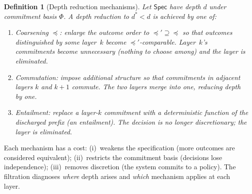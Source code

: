 \documentclass[acmsmall,review,anonymous]{acmart}
\newcommand{\Spec}{\mathsf{Spec}}
\newcommand{\Ord}{\preceq}
\newtheorem{definition}{Definition}
\theoremstyle{remark}
\numberwithin{definition}{section}
\numberwithin{theorem}{section}
\numberwithin{lemma}{section}
\numberwithin{corollary}{section}
\numberwithin{remark}{section}
\numberwithin{example}{section}
\numberwithin{observation}{section}
\numberwithin{assumption}{section}
\begin{document}
\begin{definition}[Depth reduction mechanisms]
  \label{def:depth-reduction}
  Let $\Spec$ have depth $d$ under commitment basis $\Phi$.
  A \emph{depth reduction} to $d^* < d$ is achieved by one of:
  \begin{enumerate}[nosep,label=(\roman*)]
    \item \emph{Coarsening} $\Ord$: enlarge the outcome order to
          $\Ord' \supseteq \Ord$ so that outcomes distinguished by
          some layer~$k$ become $\Ord'$-comparable.
          Layer~$k$'s commitments become unnecessary (nothing to choose
          among) and the layer is eliminated.
    \item \emph{Commutation}: impose additional structure so that
          commitments in adjacent layers $k$ and $k{+}1$ commute.
          The two layers merge into one, reducing depth by one.
    \item \emph{Entailment}: replace a layer-$k$ commitment with a
          deterministic function of the discharged prefix (an
          entailment).
          The decision is no longer discretionary; the layer is
          eliminated.
  \end{enumerate}
\end{definition}

\noindent
Each mechanism has a cost:
(i)~weakens the specification (more outcomes are considered equivalent);
(ii)~restricts the commitment basis (decisions lose independence);
(iii)~removes discretion (the system commits to a policy).
The filtration diagnoses \emph{where} depth arises and \emph{which}
mechanism applies at each layer.
\end{document}
